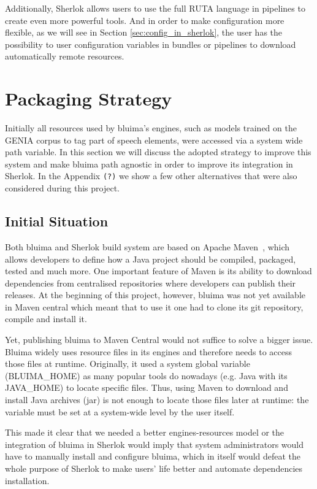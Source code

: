 \documentclass{article}
\newcommand{\ID}[1]{{\textsc{#1}}}
\newcommand{\TODO}[1]{\texttt{\textcolor{YellowOrange}{(#1)}}} %
\begin{document}
Additionally, Sherlok allows users to use the full RUTA language in pipelines to create even more
powerful tools. And in order to make configuration more flexible, as we will see in Section
\ref{sec:config_in_sherlok}, the user has the possibility to user configuration variables in bundles
or pipelines to download automatically remote resources.

\section{Packaging Strategy}

Initially all resources used by bluima's engines, such as models trained on the GENIA corpus
\cite{genia} to tag part of speech elements, were accessed via a system wide path variable. In this
section we will discuss the adopted strategy to improve this system and make bluima path agnostic in
order to improve its integration in Sherlok. In the Appendix \TODO{?} we show a few other alternatives
that were also considered during this project.

\subsection{Initial Situation}

Both bluima and Sherlok build system are based on Apache Maven~\cite{maven}, which allows developers
to define how a Java project should be compiled, packaged, tested and much more. One important
feature of Maven is its ability to download dependencies from centralised repositories where
developers can publish their releases. At the beginning of this project, however, bluima was not yet
available in Maven central which meant that to use it one had to clone its git repository, compile
and install it.

Yet, publishing bluima to Maven Central would not suffice to solve a bigger issue. Bluima widely
uses resource files in its engines and therefore needs to access those files at runtime. Originally,
it used a system global variable (\ID{BLUIMA\_HOME}) as many popular tools do nowadays (e.g. Java
with its \ID{JAVA\_HOME}) to locate specific files. Thus, using Maven to download and install Java
archives (jar) is not enough to locate those files later at runtime: the variable must be set at a
system-wide level by the user itself.

This made it clear that we needed a better engines-resources model or the integration of bluima in
Sherlok would imply that system administrators would have to manually install and configure bluima,
which in itself would defeat the whole purpose of Sherlok to make users' life better and automate
dependencies installation.
\end{document}
